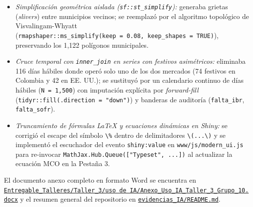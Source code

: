 \documentclass[
  10pt,
  letterpaper,
  DIV=11,
  numbers=noendperiod]{scrartcl}
\providecommand{\tightlist}{%
  \setlength{\itemsep}{0pt}\setlength{\parskip}{0pt}}
\begin{document}
\begin{enumerate}
  \begin{itemize}
  \tightlist
  \item
    \emph{Simplificación geométrica aislada
    (\texttt{sf::st\_simplify}):} generaba grietas (\emph{slivers})
    entre municipios vecinos; se reemplazó por el algoritmo topológico
    de Visvalingam-Whyatt
    (\texttt{rmapshaper::ms\_simplify(keep\ =\ 0.08,\ keep\_shapes\ =\ TRUE)}),
    preservando los 1,122 polígonos municipales.
  \item
    \emph{Cruce temporal con \texttt{inner\_join} en series con festivos
    asimétricos:} eliminaba 116 días hábiles donde operó solo uno de los
    dos mercados (74 festivos en Colombia y 42 en EE. UU.); se sustituyó
    por un calendario continuo de días hábiles (\texttt{N\ =\ 1,500})
    con imputación explícita por \emph{forward-fill}
    (\texttt{tidyr::fill(.direction\ =\ "down")}) y banderas de
    auditoría (\texttt{falta\_ibr}, \texttt{falta\_sofr}).
  \item
    \emph{Truncamiento de fórmulas LaTeX y ecuaciones dinámicas en
    Shiny:} se corrigió el escape del símbolo
    \texttt{\textbackslash{}\%} dentro de delimitadores
    \texttt{\textbackslash{}(...\textbackslash{})} y se implementó el
    escuchador del evento \texttt{shiny:value} en
    \texttt{www/js/modern\_ui.js} para re-invocar
    \texttt{MathJax.Hub.Queue({[}"Typeset",\ ...{]})} al actualizar la
    ecuación MCO en la Pestaña 3.
  \end{itemize}
\end{enumerate}

El documento anexo completo en formato Word se encuentra en
\href{../uso\%20de\%20IA/Anexo_Uso_IA_Taller_3_Grupo_10.docx}{\texttt{Entregable\_Talleres/Taller\_3/uso\ de\ IA/Anexo\_Uso\_IA\_Taller\_3\_Grupo\_10.docx}}
y el resumen general del repositorio en
\href{https://github.com/MPalma21/Talleres_de_R/blob/main/evidencias_IA/README.md}{\texttt{evidencias\_IA/README.md}}.
\end{document}
